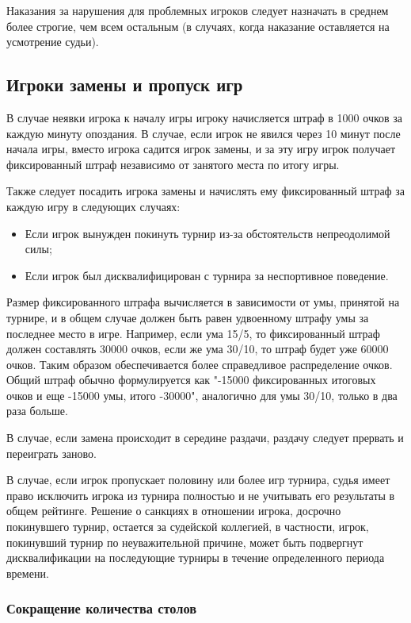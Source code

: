 Наказания за нарушения для проблемных игроков следует назначать в среднем более строгие, чем всем остальным (в случаях, когда наказание оставляется на усмотрение судьи).

\subsection{Игроки замены и пропуск игр}

В случае неявки игрока к началу игры игроку начисляется штраф в 1000 очков за каждую минуту опоздания. В случае, если игрок не явился через 10 минут после начала игры, вместо игрока садится игрок замены, и за эту игру игрок получает фиксированный штраф независимо от занятого места по итогу игры.

Также следует посадить игрока замены и начислять ему фиксированный штраф за каждую игру в следующих случаях:
\begin{itemize}
	\item Если игрок вынужден покинуть турнир из-за обстоятельств непреодолимой силы;
	\item Если игрок был дисквалифицирован с турнира за неспортивное поведение.
\end{itemize}

Размер фиксированного штрафа вычисляется в зависимости от умы, принятой на турнире, и в общем случае должен быть равен удвоенному штрафу умы за последнее место в игре. Например, если ума 15/5, то фиксированный штраф должен составлять 30000 очков, если же ума 30/10, то штраф будет уже 60000 очков. Таким образом обеспечивается более справедливое распределение очков. Общий штраф обычно формулируется как "-15000 фиксированных итоговых очков и еще -15000 умы, итого -30000", аналогично для умы 30/10, только в два раза больше.

В случае, если замена происходит в середине раздачи, раздачу следует прервать и переиграть заново.

В случае, если игрок пропускает половину или более игр турнира, судья имеет право исключить игрока из турнира полностью и не учитывать его результаты в общем рейтинге. Решение о санкциях в отношении игрока, досрочно покинувшего турнир, остается за судейской коллегией, в частности, игрок, покинувший турнир по неуважительной причине, может быть подвергнут дисквалификации на последующие турниры в течение определенного периода времени.

\subsubsection{Сокращение количества столов}

